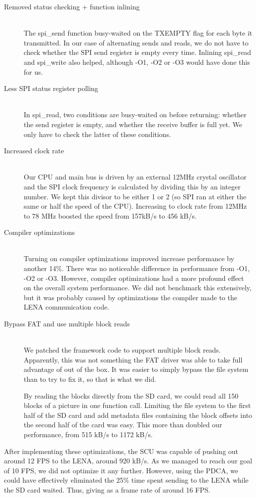 \begin{description}
	\item[Removed status checking + function inlining] \hfill \\
		The spi\_send function busy-waited on the TXEMPTY flag for each
		byte it transmitted. In our case of alternating sends and reads,
		we do not have to check whether the SPI send register is empty
		every time. Inlining spi\_read and spi\_write also helped,
		although -O1, -O2 or -O3 would have done this for us.
	\item[Less SPI status register polling] \hfill \\
		In spi\_read, two conditions are busy-waited on before
		returning: whether the send register is empty, and whether the
		receive buffer is full yet. We only have to check the latter of
		these conditions.
	\item[Increased clock rate] \hfill \\
		Our CPU and main bus is driven by an external 12MHz crystal
		oscillator and the SPI clock frequency is calculated by dividing
		this by an integer number. We kept this divisor to be either 1
		or 2 (so SPI ran at either the same or half the speed of the
		CPU). Increasing to clock rate from 12MHz to 78 MHz boosted the
		speed from 157kB/s to 456 kB/s.
	\item[Compiler optimizations] \hfill \\
		Turning on compiler optimizations improved increase performance
		by another 14\%. There was no noticeable difference in
		performance from -O1, -O2 or -O3. However, compiler
		optimizations had a more profound effect on the overall system
		performance. We did not benchmark this extensively, but it was
		probably caused by optimizations the compiler made to the \ac{LENA}
		communication code.
	\item[Bypass FAT and use multiple block reads] \hfill \\
		We patched the framework code to support multiple block reads.
		Apparently, this was not something the FAT driver was able to
		take full advantage of out of the box. It was easier to simply
		bypass the file system than to try to fix it, so that is what we
		did.
		
		By reading the blocks directly from the SD card, we could read
		all 150 blocks of a picture in one function call. Limiting the
		file system to the first half of the SD card and add metadata
		files containing the block offsets into the second half of the
		card was easy. This more than doubled our performance, from 515
		kB/s to 1172 kB/s.
\end{description}

After implementing these optimizations, the \ac{SCU} was capable of pushing out around
12 FPS to the \ac{LENA}, around 920 kB/s. As we managed to reach our goal of 10
FPS, we did not optimize it any further. However, using the \ac{PDCA}, we could
have effectively eliminated the 25\% time spent sending to the \ac{LENA} while
the \ac{SD} card waited. Thus, giving as a frame rate of around 16
FPS. 


